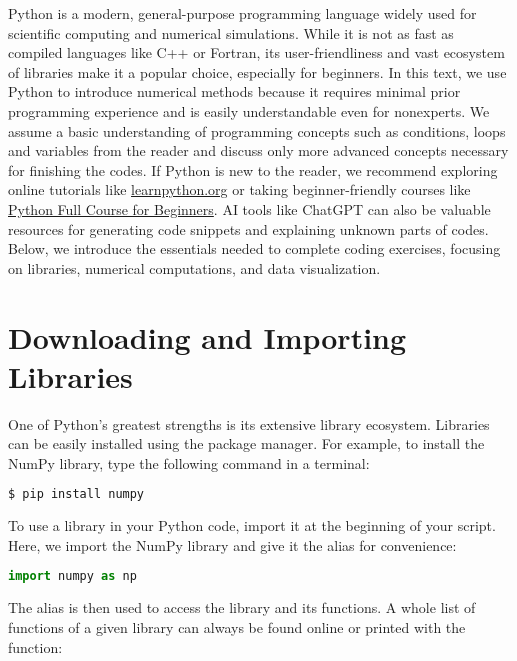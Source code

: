 Python is a modern, general-purpose programming language widely used for scientific computing and numerical simulations. While it is not as fast as compiled languages like C++ or Fortran, its user-friendliness and vast ecosystem of libraries make it a popular choice, especially for beginners. In this text, we use Python to introduce numerical methods because it requires minimal prior programming experience and is easily understandable even for nonexperts. We assume a basic understanding of programming concepts such as conditions, loops and variables from the reader and discuss only more advanced concepts necessary for finishing the codes. If Python is new to the reader, we recommend exploring online tutorials like \href{https://www.learnpython.org/}{learnpython.org} or taking beginner-friendly courses like \href{https://www.youtube.com/watch?v=_uQrJ0TkZlc}{Python Full Course for Beginners}. AI tools like ChatGPT can also be valuable resources for generating code snippets and explaining unknown parts of codes.
Below, we introduce the essentials needed to complete coding exercises, focusing on libraries, numerical computations, and data visualization.



\section*{Downloading and Importing Libraries}

One of Python's greatest strengths is its extensive library ecosystem. Libraries can be easily installed using the  package manager. For example, to install the NumPy library, type the following command in a terminal:

\begin{lstlisting}[language=bash, style=mystyle2]
$ pip install numpy
\end{lstlisting}

To use a library in your Python code, import it at the beginning of your script. Here, we import the NumPy library and give it the alias  for convenience:

\begin{lstlisting}[language=Python, style=mystyle2]
import numpy as np
\end{lstlisting}

The alias is then used to access the library and its functions. A whole list of functions of a given library can always be found online or printed with the  function:

